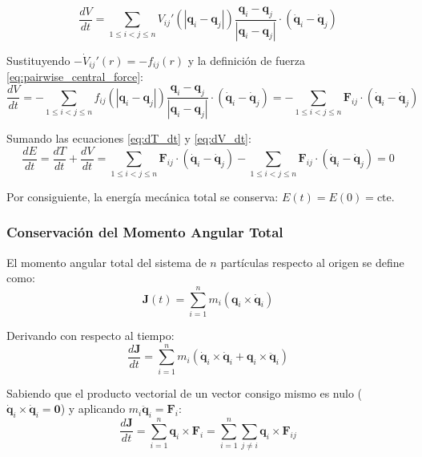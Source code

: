 \documentclass[11pt, a4paper]{article}
\begin{document}
	\begin{equation}
		\frac{dV}{dt} = \sum_{1 \le i < j \le n} V_{ij}'(|\mathbf{q}_i - \mathbf{q}_j|) \frac{\mathbf{q}_i - \mathbf{q}_j}{|\mathbf{q}_i - \mathbf{q}_j|} \cdot (\dot{\mathbf{q}}_i - \dot{\mathbf{q}}_j)
	\end{equation}
	
	Sustituyendo $-\dot{V}_{ij}'(r) = -f_{ij}(r)$ y la definición de fuerza \eqref{eq:pairwise_central_force}:
	\begin{equation}
		\frac{dV}{dt} = -\sum_{1 \le i < j \le n} f_{ij}(|\mathbf{q}_i - \mathbf{q}_j|) \frac{\mathbf{q}_i - \mathbf{q}_j}{|\mathbf{q}_i - \mathbf{q}_j|} \cdot (\dot{\mathbf{q}}_i - \dot{\mathbf{q}}_j) = -\sum_{1 \le i < j \le n} \mathbf{F}_{ij} \cdot (\dot{\mathbf{q}}_i - \dot{\mathbf{q}}_j)
		\label{eq:dV_dt}
	\end{equation}
	
	Sumando las ecuaciones \eqref{eq:dT_dt} y \eqref{eq:dV_dt}:
	\begin{equation}
		\frac{dE}{dt} = \frac{dT}{dt} + \frac{dV}{dt} = \sum_{1 \le i < j \le n} \mathbf{F}_{ij} \cdot (\dot{\mathbf{q}}_i - \dot{\mathbf{q}}_j) - \sum_{1 \le i < j \le n} \mathbf{F}_{ij} \cdot (\dot{\mathbf{q}}_i - \dot{\mathbf{q}}_j) = 0
	\end{equation}
	
	Por consiguiente, la energía mecánica total se conserva: $E(t) = E(0) = \text{cte.}$
	
	\subsubsection{Conservación del Momento Angular Total}
	
	El momento angular total del sistema de $n$ partículas respecto al origen se define como:
	\begin{equation}
		\mathbf{J}(t) = \sum_{i=1}^n m_i (\mathbf{q}_i \times \dot{\mathbf{q}}_i)
	\end{equation}
	
	Derivando con respecto al tiempo:
	\begin{equation}
		\frac{d\mathbf{J}}{dt} = \sum_{i=1}^n m_i \left( \dot{\mathbf{q}}_i \times \dot{\mathbf{q}}_i + \mathbf{q}_i \times \ddot{\mathbf{q}}_i \right)
	\end{equation}
	
	Sabiendo que el producto vectorial de un vector consigo mismo es nulo ($\dot{\mathbf{q}}_i \times \dot{\mathbf{q}}_i = \mathbf{0}$) y aplicando $m_i \ddot{\mathbf{q}}_i = \mathbf{F}_i$:
	\begin{equation}
		\frac{d\mathbf{J}}{dt} = \sum_{i=1}^n \mathbf{q}_i \times \mathbf{F}_i = \sum_{i=1}^n \sum_{j \neq i} \mathbf{q}_i \times \mathbf{F}_{ij}
	\end{equation}
	
\end{document}
